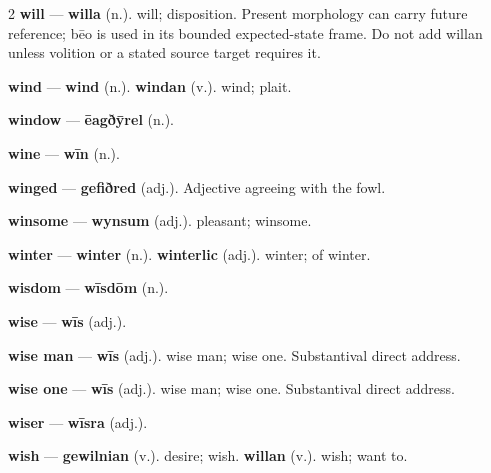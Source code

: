 \begin{multicols}{2}
\textbf{will} — \textbf{willa} (n.). will; disposition. Present morphology can carry future reference; bēo is used in its bounded expected-state frame. Do not add willan unless volition or a stated source target requires it.\par
\textbf{wind} — \textbf{wind} (n.).  \textbf{windan} (v.). wind; plait.\par
\textbf{window} — \textbf{ēagðȳrel} (n.).\par
\textbf{wine} — \textbf{wīn} (n.).\par
\textbf{winged} — \textbf{gefiðred} (adj.). Adjective agreeing with the fowl.\par
\textbf{winsome} — \textbf{wynsum} (adj.). pleasant; winsome.\par
\textbf{winter} — \textbf{winter} (n.).  \textbf{winterlic} (adj.). winter; of winter.\par
\textbf{wisdom} — \textbf{wīsdōm} (n.).\par
\textbf{wise} — \textbf{wīs} (adj.).\par
\textbf{wise man} — \textbf{wīs} (adj.). wise man; wise one. Substantival direct address.\par
\textbf{wise one} — \textbf{wīs} (adj.). wise man; wise one. Substantival direct address.\par
\textbf{wiser} — \textbf{wīsra} (adj.).\par
\textbf{wish} — \textbf{gewilnian} (v.). desire; wish. \textbf{willan} (v.). wish; want to.\par

\end{multicols}
